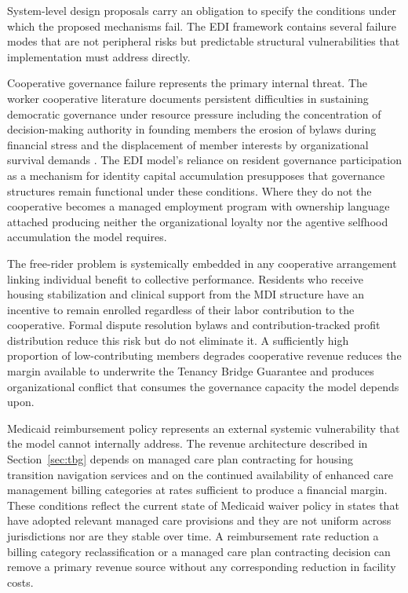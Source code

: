 \documentclass[12pt, letterpaper]{article}
\begin{document}
System-level design proposals carry an obligation to specify the conditions under which the proposed mechanisms fail. The EDI framework contains several failure modes that are not peripheral risks but predictable structural vulnerabilities that implementation must address directly.

Cooperative governance failure represents the primary internal threat. The worker cooperative literature documents persistent difficulties in sustaining democratic governance under resource pressure including the concentration of decision-making authority in founding members the erosion of bylaws during financial stress and the displacement of member interests by organizational survival demands \citep{cornforth1995patterns}. The EDI model's reliance on resident governance participation as a mechanism for identity capital accumulation presupposes that governance structures remain functional under these conditions. Where they do not the cooperative becomes a managed employment program with ownership language attached producing neither the organizational loyalty nor the agentive selfhood accumulation the model requires.

The free-rider problem is systemically embedded in any cooperative arrangement linking individual benefit to collective performance. Residents who receive housing stabilization and clinical support from the MDI structure have an incentive to remain enrolled regardless of their labor contribution to the cooperative. Formal dispute resolution bylaws and contribution-tracked profit distribution reduce this risk but do not eliminate it. A sufficiently high proportion of low-contributing members degrades cooperative revenue reduces the margin available to underwrite the Tenancy Bridge Guarantee and produces organizational conflict that consumes the governance capacity the model depends upon.

Medicaid reimbursement policy represents an external systemic vulnerability that the model cannot internally address. The revenue architecture described in Section~\ref{sec:tbg} depends on managed care plan contracting for housing transition navigation services and on the continued availability of enhanced care management billing categories at rates sufficient to produce a financial margin. These conditions reflect the current state of Medicaid waiver policy in states that have adopted relevant managed care provisions and they are not uniform across jurisdictions nor are they stable over time. A reimbursement rate reduction a billing category reclassification or a managed care plan contracting decision can remove a primary revenue source without any corresponding reduction in facility costs.
\end{document}
